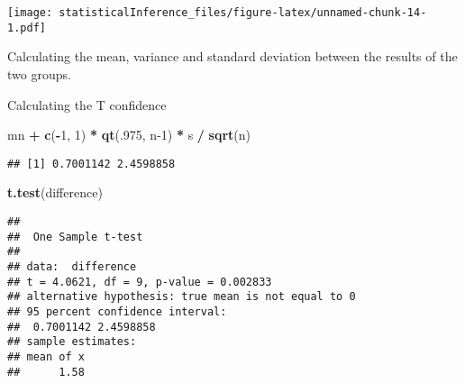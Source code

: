 \documentclass[
]{article}
\newenvironment{Shaded}{\begin{snugshade}}{\end{snugshade}}
\newcommand{\DecValTok}[1]{\textcolor[rgb]{0.00,0.00,0.81}{#1}}
\newcommand{\KeywordTok}[1]{\textcolor[rgb]{0.13,0.29,0.53}{\textbf{#1}}}
\newcommand{\NormalTok}[1]{#1}
\newcommand{\OperatorTok}[1]{\textcolor[rgb]{0.81,0.36,0.00}{\textbf{#1}}}
\newcommand{\StringTok}[1]{\textcolor[rgb]{0.31,0.60,0.02}{#1}}
\begin{document}
\texttt{[image: statisticalInference\_files/figure-latex/unnamed-chunk-14-1.pdf]}

Calculating the mean, variance and standard deviation between the
results of the two groups.

\begin{Shaded}
\end{Shaded}

Calculating the T confidence

\begin{Shaded}
\begin{Highlighting}[]
\NormalTok{mn }\OperatorTok{+}\StringTok{ }\KeywordTok{c}\NormalTok{(}\OperatorTok{-}\DecValTok{1}\NormalTok{, }\DecValTok{1}\NormalTok{) }\OperatorTok{*}\StringTok{ }\KeywordTok{qt}\NormalTok{(.}\DecValTok{975}\NormalTok{, n}\DecValTok{-1}\NormalTok{) }\OperatorTok{*}\StringTok{ }\NormalTok{s }\OperatorTok{/}\StringTok{ }\KeywordTok{sqrt}\NormalTok{(n)}
\end{Highlighting}
\end{Shaded}

\begin{verbatim}
## [1] 0.7001142 2.4598858
\end{verbatim}

\begin{Shaded}
\begin{Highlighting}[]
\KeywordTok{t.test}\NormalTok{(difference)}
\end{Highlighting}
\end{Shaded}

\begin{verbatim}
## 
##  One Sample t-test
## 
## data:  difference
## t = 4.0621, df = 9, p-value = 0.002833
## alternative hypothesis: true mean is not equal to 0
## 95 percent confidence interval:
##  0.7001142 2.4598858
## sample estimates:
## mean of x 
##      1.58
\end{verbatim}
\end{document}
